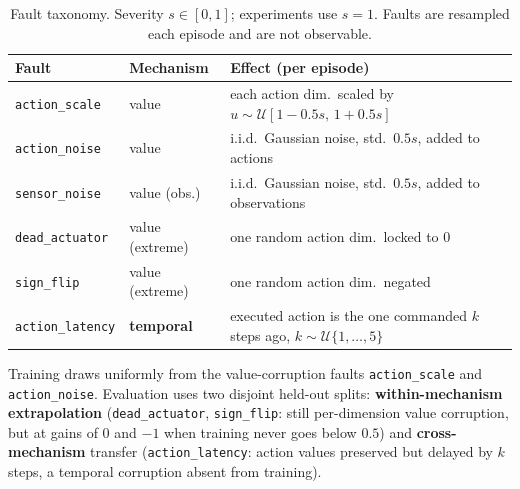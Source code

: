\documentclass[conference]{IEEEtran}
\begin{document}
\begin{table}[!t]

\centering

\caption{Fault taxonomy. Severity $s \in [0,1]$; experiments use $s=1$. Faults are resampled each episode and are not observable.}

\label{tab:faults}

\begin{tabular}{llp{3.5cm}}

\toprule

\textbf{Fault} & \textbf{Mechanism} & \textbf{Effect (per episode)} \\

\midrule

\texttt{action\_scale}   & value     & each action dim.\ scaled by $u \sim \mathcal{U}[1{-}0.5s,\, 1{+}0.5s]$ \\

\texttt{action\_noise}   & value     & i.i.d.\ Gaussian noise, std.\ $0.5s$, added to actions \\

\texttt{sensor\_noise}   & value (obs.) & i.i.d.\ Gaussian noise, std.\ $0.5s$, added to observations \\

\texttt{dead\_actuator}  & value (extreme) & one random action dim.\ locked to $0$ \\

\texttt{sign\_flip}      & value (extreme) & one random action dim.\ negated \\

\texttt{action\_latency} & \textbf{temporal} & executed action is the one commanded $k$ steps ago, $k \sim \mathcal{U}\{1,\dots,5\}$ \\

\bottomrule

\end{tabular}

\end{table}



Training draws uniformly from the value-corruption faults \texttt{action\_scale} and \texttt{action\_noise}. Evaluation uses two disjoint held-out splits: \textbf{within-mechanism extrapolation} (\texttt{dead\_actuator}, \texttt{sign\_flip}: still per-dimension value corruption, but at gains of $0$ and $-1$ when training never goes below $0.5$) and \textbf{cross-mechanism} transfer (\texttt{action\_latency}: action values preserved but delayed by $k$ steps, a temporal corruption absent from training).
\end{document}
